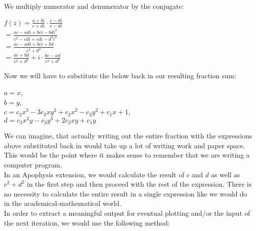 \documentclass[]{article}
\begin{document}
\noindent We multiply numerator and denumerator by the conjugate:

\begin{flushleft}
	\hspace{20pt} $f(z) = \frac{a + bi}{c + di} \cdot \frac{c - di}{c - di} $ \\
	\medskip
	\hspace{20pt}\hspace{2.5em}$= \frac{ac - adi + bci - bdi^2}{c^2 - cdi + cdi - d^2i^2}$ \\
	\medskip
	\hspace{20pt}\hspace{2.5em}$= \frac{ac - adi + bci + bd}{c^2 + d^2}$ \\
	\medskip
	\hspace{20pt}\hspace{2.5em}$= \frac{ac + bd}{c^2 + d^2} + i \cdot \frac{bc - ad}{c^2 + d^2}$
\end{flushleft}

\noindent Now we will have to substitute the below back in our resulting fraction sum:

\begin{flushleft}
	\hspace{20pt} $a = x$, \\
	\hspace{20pt} $b = y$, \\
	\hspace{20pt} $c = c_3x^3 - 3c_3xy^2 + c_2x^2 - c_2y^2 + c_1x + 1$, \\
	\hspace{20pt} $d = c_3x^2y - c_3y^3 + 2c_2xy + c_1y$ \\
\end{flushleft}

\noindent We can imagine, that actually writing out the entire fraction with the expressions above substituted back in would take up a lot of writing work and paper space. This would be the point where it makes sense to remember that we are writing a computer program. \\

\noindent In an Apophysis extension, we would calculate the result of $c$ and $d$ as well as $c^2 + d^2$ in the first step and then proceed with the rest of the expression. There is no necessity to calculate the entire result in a single expression like we would do in the academical-mathematical world. \\

\noindent In order to extract a meaningful output for eventual plotting and/or the input of the next iteration, we would use the following method:
\end{document}
